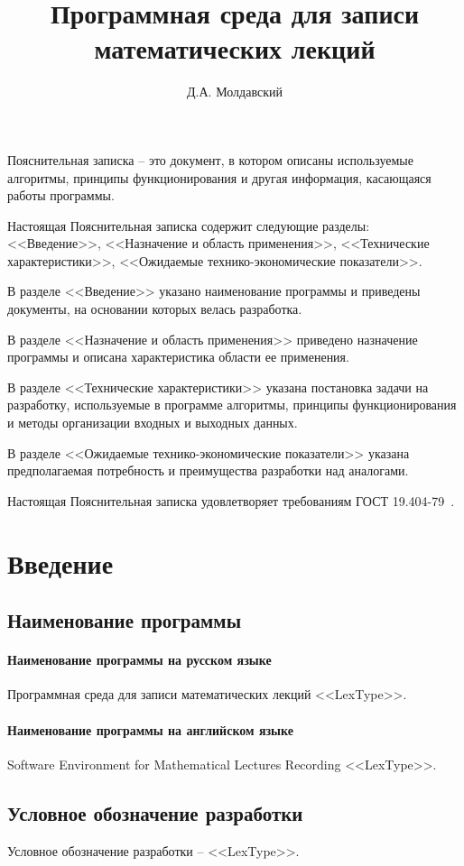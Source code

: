 \documentclass[explnote]{espd}
\author{Д.А. Молдавский}
\title{Программная среда для записи\\математических лекций}
\begin{document}
\annotation
Пояснительная записка -- это документ, в котором описаны используемые алгоритмы, принципы функционирования и другая информация, касающаяся работы программы.

Настоящая Пояснительная записка содержит следующие разделы: <<Введение>>, <<Назначение и область применения>>, <<Технические характеристики>>, <<Ожидаемые технико-экономические показатели>>.

В разделе <<Введение>> указано наименование программы и приведены документы, на основании которых велась разработка.

В разделе <<Назначение и область применения>> приведено назначение программы и описана характеристика области ее применения.

В разделе <<Технические характеристики>> указана постановка задачи на разработку, используемые в программе алгоритмы, принципы функционирования и методы организации входных и выходных данных.

В разделе <<Ожидаемые технико-экономические показатели>> указана предполагаемая потребность и преимущества разработки над аналогами.

Настоящая Пояснительная записка удовлетворяет требованиям ГОСТ 19.404-79~\cite{espd404}.

\tableofcontents

\section{Введение}
\subsection{Наименование программы}
\paragraph{Наименование программы на русском языке}
Программная среда для записи математических лекций <<LexType>>.
\paragraph{Наименование программы на английском языке}
Software Environment for Mathematical Lectures Recording <<LexType>>.

\subsection{Условное обозначение разработки}
Условное обозначение разработки -- <<LexType>>.
\end{document}
